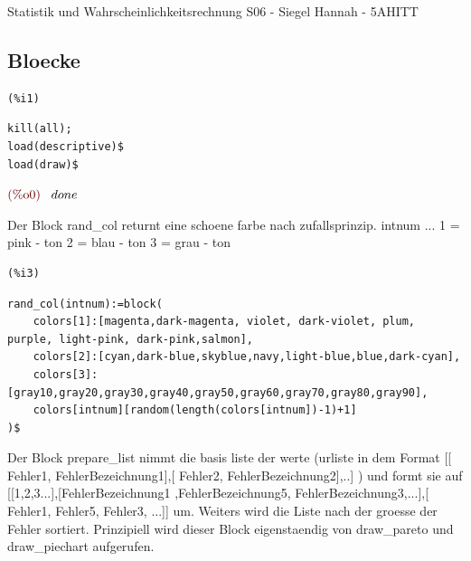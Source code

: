\documentclass{article}
\begin{document}
\pagebreak{}
{\Huge {\sc Statistik und Wahrscheinlichkeitsrechnung
S06  -  Siegel Hannah  -  5AHITT}}
\setcounter{section}{0}
\setcounter{subsection}{0}
\setcounter{figure}{0}



\subsection{Bloecke}



\noindent
\begin{minipage}[t]{8ex}{\color{red}\bf
\begin{verbatim}
(%i1) 
\end{verbatim}}
\end{minipage}
\begin{minipage}[t]{\textwidth}{\color{blue}
\begin{verbatim}
kill(all);
load(descriptive)$
load(draw)$
\end{verbatim}}
\end{minipage}
\begin{math}\displaystyle
\parbox{8ex}{\color{labelcolor}(\%o0) }
done
\end{math}

Der Block  rand\_col returnt eine schoene farbe nach zufallsprinzip.
    intnum ... 1 = pink - ton
               2 = blau - ton
               3 = grau - ton

\noindent
\begin{minipage}[t]{8ex}{\color{red}\bf
\begin{verbatim}
(%i3) 
\end{verbatim}}
\end{minipage}
\begin{minipage}[t]{\textwidth}{\color{blue}
\begin{verbatim}
rand_col(intnum):=block(
    colors[1]:[magenta,dark-magenta, violet, dark-violet, plum, purple, light-pink, dark-pink,salmon],
    colors[2]:[cyan,dark-blue,skyblue,navy,light-blue,blue,dark-cyan],
    colors[3]:[gray10,gray20,gray30,gray40,gray50,gray60,gray70,gray80,gray90],
    colors[intnum][random(length(colors[intnum])-1)+1]
)$
\end{verbatim}}
\end{minipage}

Der Block  prepare\_list nimmt die basis liste der werte 
    (urliste in dem Format [[ Fehler1, FehlerBezeichnung1],[ Fehler2, FehlerBezeichnung2],..] ) 
    und formt sie auf [[1,2,3...],[FehlerBezeichnung1 ,FehlerBezeichnung5, FehlerBezeichnung3,...],[ Fehler1,  Fehler5,  Fehler3, ...]] um.
Weiters wird die Liste nach der groesse der Fehler sortiert. 
Prinzipiell wird dieser Block eigenstaendig von draw\_pareto und draw\_piechart aufgerufen.
\end{document}

